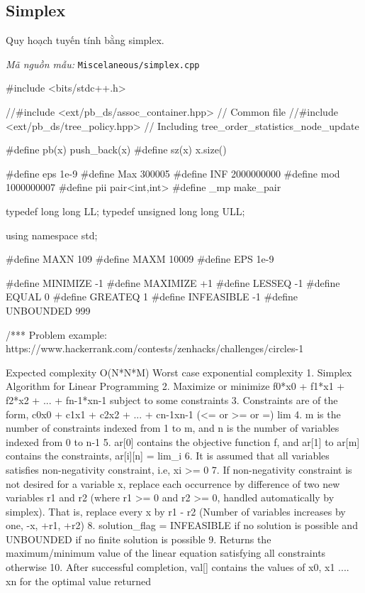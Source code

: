 \documentclass[11pt]{article}
\newcommand{\codepath}[1]{\par\noindent\textit{Mã nguồn mẫu:} \texttt{#1}\par}
\begin{document}
\subsection{Simplex}

Quy hoạch tuyến tính bằng simplex.

\codepath{Miscelaneous/simplex.cpp}

\begingroup\scriptsize
\begin{vncode}
#include <bits/stdc++.h>

//#include <ext/pb_ds/assoc_container.hpp> // Common file
//#include <ext/pb_ds/tree_policy.hpp> // Including tree_order_statistics_node_update

#define pb(x) push_back(x)
#define sz(x) x.size()

#define eps 1e-9
#define Max 300005
#define INF 2000000000
#define mod 1000000007
#define pii pair<int,int>
#define _mp make_pair

typedef long long LL;
typedef unsigned long long ULL;

using namespace std;

#define MAXN 109
#define MAXM 10009
#define EPS 1e-9

#define MINIMIZE -1
#define MAXIMIZE +1
#define LESSEQ -1
#define EQUAL 0
#define GREATEQ 1
#define INFEASIBLE -1
#define UNBOUNDED 999

/***
Problem example: https://www.hackerrank.com/contests/zenhacks/challenges/circles-1

Expected complexity O(N*N*M)
Worst case exponential complexity
1.  Simplex Algorithm for Linear Programming
2.  Maximize or minimize f0*x0 + f1*x1 + f2*x2 + ... + fn-1*xn-1 subject to some constraints
3.  Constraints are of the form, c0x0 + c1x1 + c2x2 + ... + cn-1xn-1 (<= or >= or =) lim
4.  m is the number of constraints indexed from 1 to m, and n is the number of variables indexed from 0 to n-1
5.  ar[0] contains the objective function f, and ar[1] to ar[m] contains the constraints, ar[i][n] = lim_i
6.  It is assumed that all variables satisfies non-negativity constraint, i.e, xi >= 0
7.  If non-negativity constraint is not desired for a variable x, replace each occurrence
	by difference of two new variables r1 and r2 (where r1 >= 0 and r2 >= 0, handled automatically by simplex).
	That is, replace every x by r1 - r2 (Number of variables increases by one, -x, +r1, +r2)
8.  solution_flag = INFEASIBLE if no solution is possible and UNBOUNDED if no finite solution is possible
9.  Returns the maximum/minimum value of the linear equation satisfying all constraints otherwise
10. After successful completion, val[] contains the values of x0, x1 .... xn for the optimal value returned


\end{vncode}
\end{document}
